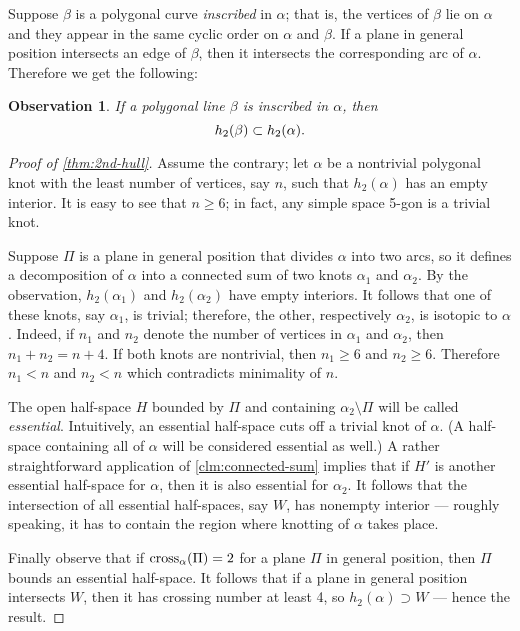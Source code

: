\documentclass{article}
\newcommand*{\z}[1]{#1\nobreak\discretionary{}%
            {\hbox{$\mathsurround=0pt #1$}}{}}
\theoremstyle{theorem}
\newtheorem{Crofton-type formula}[theorem]{Crofton-type formula}
\newtheorem{Douglas--Rado theorem}[theorem]{Douglas--Rado theorem}
\newtheorem{Extended monotonicity theorem}[theorem]{Extended monotonicity theorem}
\newtheorem{Observation}[theorem]{Observation}
\theoremstyle{definition}
\def\cross{\mathop{\rm cross}\nolimits}
\def\ge{\geqslant}
\begin{document}
Suppose $\beta$ is a polygonal curve \emph{inscribed} in $\alpha$;
that is, the vertices of $\beta$ lie on $\alpha$ and they appear in the same cyclic order on $\alpha$ and $\beta$.
If a plane in general position intersects an edge of $\beta$, then it intersects
the corresponding arc of $\alpha$. %
Therefore we get the following:

\begin{Observation}
If a polygonal line $\beta$ is inscribed in $\alpha$, then 
\[h_2(\beta)\z\subset h_2(\alpha).\]
\end{Observation}

\begin{proof}[Proof of \ref{thm:2nd-hull}]
Assume the contrary; let $\alpha$ be a nontrivial polygonal knot with the least number of vertices, say $n$, such that $h_2(\alpha)$ has an empty interior.
It is easy to see that $n\ge 6$;
in fact, any simple space 5-gon is a trivial knot.

Suppose $\Pi$ is a plane in general position that divides $\alpha$ into two arcs, so it defines a decomposition of $\alpha$ into a connected sum of two knots $\alpha_1$ and $\alpha_2$.
By the observation, $h_2(\alpha_1)$ and $h_2(\alpha_2)$ have empty interiors.
It follows that one of these knots, say $\alpha_1$, is trivial;
therefore, the other, respectively $\alpha_2$, is isotopic to $\alpha$.
Indeed, if $n_1$ and $n_2$ denote the number of vertices in $\alpha_1$ and $\alpha_2$, then $n_1+n_2=n+4$. 
If both knots are nontrivial, then $n_1\ge 6$ and $n_2\ge 6$.
Therefore $n_1<n$ and $n_2<n$ which contradicts minimality of $n$.

The open half-space $H$ bounded by $\Pi$ and containing $\alpha_2\setminus\Pi$ will be called \emph{essential}. Intuitively, an essential half-space cuts off
a trivial knot of $\alpha$. (A half-space containing all of $\alpha$ will be considered essential as well.)
A rather straightforward application of \ref{clm:connected-sum} implies that if $H'$ is another essential half-space for $\alpha$, then it is also essential for $\alpha_2$.
It follows that the intersection of all essential half-spaces, say $W$, has nonempty interior --- roughly speaking, it has to contain the region where knotting of $\alpha$ takes place.

Finally observe that if $\cross_\alpha(\Pi)=2$ for a plane $\Pi$ in general position, then $\Pi$ bounds an essential half-space. 
It follows that if a plane in general position intersects $W$, then it has  crossing number at least 4,
so $h_2(\alpha)\supset W$ --- hence the result.
\end{proof}
\end{document}
